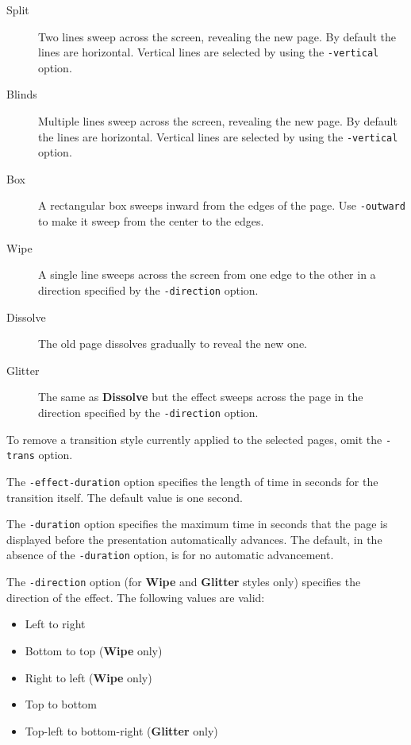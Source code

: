 \documentclass{book}
\begin{document}
\begin{description}
  \item[Split]Two lines sweep across the screen, revealing the new page. By
default the lines are horizontal. Vertical lines are selected by using the
\texttt{-vertical} option.
  \item[Blinds]Multiple lines sweep across the screen, revealing the new page.
By default the lines are horizontal. Vertical lines are selected by using the
\texttt{-vertical} option.
  \item[Box]A rectangular box sweeps inward from the edges of the page. Use
\texttt{-outward} to make it sweep from the center to the edges.
  \item[Wipe]A single line sweeps across the screen from one edge to the other
in a direction specified by the \texttt{-direction} option.
  \item[Dissolve]The old page dissolves gradually to reveal the new one.
  \item[Glitter]The same as \textbf{Dissolve} but the effect sweeps across the
page in the direction specified by the \texttt{-direction} option.
\end{description}

\noindent To remove a transition style currently applied to the selected pages,
omit the \texttt{-trans} option.

The \texttt{-effect-duration} option specifies the length of time in seconds
for the transition itself. The default value is one second.

The \texttt{-duration} option specifies the maximum time in seconds that the
page is displayed before the presentation automatically advances. The default,
in the absence of the \texttt{-duration} option, is for no automatic
advancement.

The \texttt{-direction} option (for \textbf{Wipe} and \textbf{Glitter} styles
only) specifies the direction of the effect. The following values are valid:
\begin{itemize}
  \item[\textbf{0}] Left to right
  \item[\textbf{90}] Bottom to top (\textbf{Wipe} only)
  \item[\textbf{180}] Right to left (\textbf{Wipe} only)
  \item[\textbf{270}] Top to bottom
  \item[\textbf{315}] Top-left to bottom-right (\textbf{Glitter} only)
\end{itemize}
\end{document}
